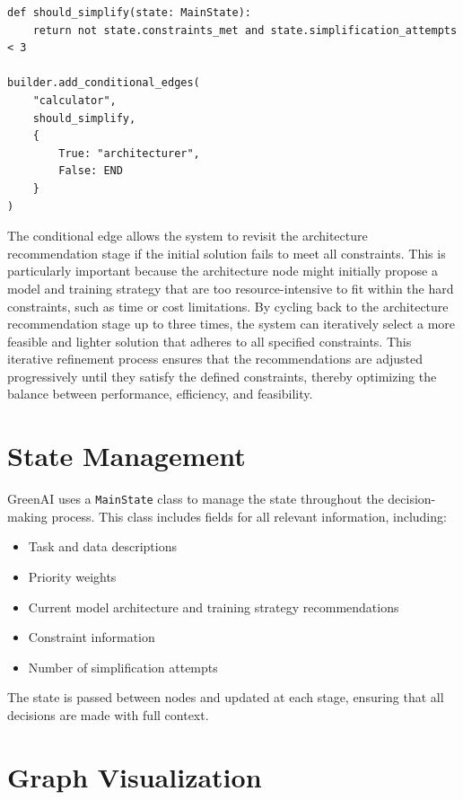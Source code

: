 \documentclass{report}
\begin{document}
\begin{verbatim}
def should_simplify(state: MainState):
    return not state.constraints_met and state.simplification_attempts < 3

builder.add_conditional_edges(
    "calculator",
    should_simplify,
    {
        True: "architecturer",
        False: END
    }
)
\end{verbatim}

The conditional edge allows the system to revisit the architecture recommendation stage if the initial solution fails to meet all constraints. This is particularly important because the architecture node might initially propose a model and training strategy that are too resource-intensive to fit within the hard constraints, such as time or cost limitations. By cycling back to the architecture recommendation stage up to three times, the system can iteratively select a more feasible and lighter solution that adheres to all specified constraints. This iterative refinement process ensures that the recommendations are adjusted progressively until they satisfy the defined constraints, thereby optimizing the balance between performance, efficiency, and feasibility.

\section{State Management}

GreenAI uses a \texttt{MainState} class to manage the state throughout the decision-making process. This class includes fields for all relevant information, including:

\begin{itemize}
    \item Task and data descriptions
    \item Priority weights
    \item Current model architecture and training strategy recommendations
    \item Constraint information
    \item Number of simplification attempts
\end{itemize}

The state is passed between nodes and updated at each stage, ensuring that all decisions are made with full context.

\section{Graph Visualization}
\end{document}
